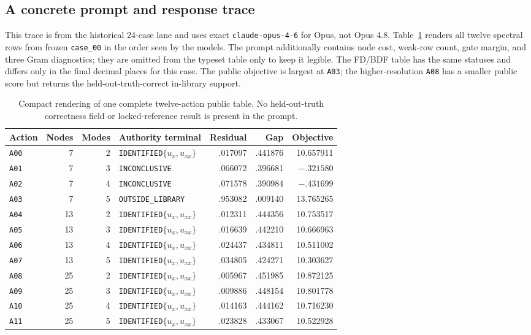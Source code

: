 \documentclass{article}
\newcommand{\ID}{\texttt{IDENTIFIED}\xspace}
\newcommand{\OUT}{\texttt{OUTSIDE\_LIBRARY}\xspace}
\newcommand{\INC}{\texttt{INCONCLUSIVE}\xspace}
\begin{document}
\subsection{A concrete prompt and response trace}
This trace is from the historical 24-case lane and uses exact \texttt{claude-opus-4-6} for Opus,
not Opus 4.8.
Table~\ref{tab:prompttrace} renders all twelve spectral rows from frozen
\texttt{case\_00} in the order seen by the models. The prompt additionally contains node cost,
weak-row count, gate margin, and three Gram diagnostics; they are omitted from the typeset table
only to keep it legible. The FD/BDF table has the same statuses and differs only in the final
decimal places for this case. The public objective is largest at \texttt{A03}; the
higher-resolution \texttt{A08} has a smaller public score but returns the held-out-truth-correct
in-library support.
\begin{table}[ht]
\centering\scriptsize
\caption{Compact rendering of one complete twelve-action public table. No held-out-truth correctness
field or locked-reference result is present in the prompt.}
\label{tab:prompttrace}
\begin{tabular}{lrrlrrr}
\toprule
Action & Nodes & Modes & Authority terminal & Residual & Gap & Objective \\
\midrule
\texttt{A00} & 7  & 2 & \ID $\{u_x,u_{xx}\}$ & .017097 & .441876 & 10.657911 \\
\texttt{A01} & 7  & 3 & \INC                        & .066072 & .396681 & $-.321580$ \\
\texttt{A02} & 7  & 4 & \INC                        & .071578 & .390984 & $-.431699$ \\
\texttt{A03} & 7  & 5 & \OUT                       & .953082 & .009140 & 13.765265 \\
\texttt{A04} & 13 & 2 & \ID $\{u_x,u_{xx}\}$ & .012311 & .444356 & 10.753517 \\
\texttt{A05} & 13 & 3 & \ID $\{u_x,u_{xx}\}$ & .016639 & .442210 & 10.666963 \\
\texttt{A06} & 13 & 4 & \ID $\{u_x,u_{xx}\}$ & .024437 & .434811 & 10.511002 \\
\texttt{A07} & 13 & 5 & \ID $\{u_x,u_{xx}\}$ & .034805 & .424271 & 10.303627 \\
\texttt{A08} & 25 & 2 & \ID $\{u_x,u_{xx}\}$ & .005967 & .451985 & 10.872125 \\
\texttt{A09} & 25 & 3 & \ID $\{u_x,u_{xx}\}$ & .009886 & .448154 & 10.801778 \\
\texttt{A10} & 25 & 4 & \ID $\{u_x,u_{xx}\}$ & .014163 & .444162 & 10.716230 \\
\texttt{A11} & 25 & 5 & \ID $\{u_x,u_{xx}\}$ & .023828 & .433067 & 10.522928 \\
\bottomrule
\end{tabular}
\end{table}
\end{document}
